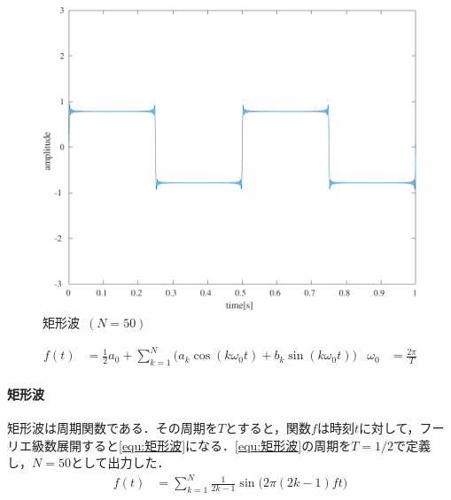\begin{figure}
    \includegraphics[keepaspectratio,width=.3\textwidth]{../../Figures/01_04_1.pdf}
    \caption{矩形波\ \((N=50)\)}
    \label{fig:矩形波}
\end{figure}
\begin{align}
    f(t) & =\frac{1}{2}a_0 + \sum_{k=1}^{N}\big(a_k\cos(k\omega_0t)+b_k\sin(k\omega_0t)\big) & \omega_0 & =\frac{2\pi}{T}\label{equ:フーリエ級数展開}
\end{align}
\paragraph{矩形波}
矩形波は周期関数である．その周期を\(T\)とすると，関数\(f\)は時刻\(t\)に対して，フーリエ級数展開すると\eqref{equ:矩形波}になる．\eqref{equ:矩形波}の周期を\(T=1/2\)で定義し，\(N=50\)として出力した．
\begin{align}
    f(t) & =\sum_{k=1}^{N}\frac{1}{2k-1}\sin\big(2\pi(2k-1)ft\big)\label{equ:矩形波}
\end{align}
